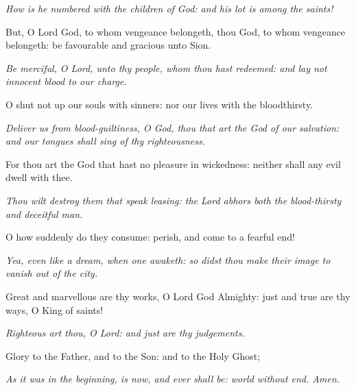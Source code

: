 \textit{How is he numbered with the children of God: and his lot is
among the saints!}

But, O Lord God, to whom vengeance belongeth, thou God, to whom vengeance belongeth: be favourable and gracious unto Sion.

\textit{Be merciful, O Lord, unto thy people, whom thou hast redeemed: and lay not innocent blood to our charge.}

O shut not up our souls with sinners: nor our lives with the bloodthirsty.

\textit{Deliver us from blood-guiltiness, O God, thou that art the God of our
salvation: and our tongues shall sing of thy righteousness.}

For thou art the God that hast no pleasure in wickedness: neither shall any evil dwell with thee.

\textit{Thou wilt destroy them that speak leasing: the Lord abhors both the blood-thirsty and deceitful man.}

O how suddenly do they consume: perish, and come to a fearful end!

\textit{Yea, even like a dream, when one awaketh: so didst thou make their image to vanish out of the city.}

Great and marvellous are thy works, O Lord God Almighty: just and true are thy ways, O King of saints!

\textit{Righteous art thou, O Lord: and just are thy judgements.}

Glory to the Father, and to the Son: and to the Holy Ghost;

\textit{As it was in the beginning, is now, and ever shall be: world without end. Amen.}

